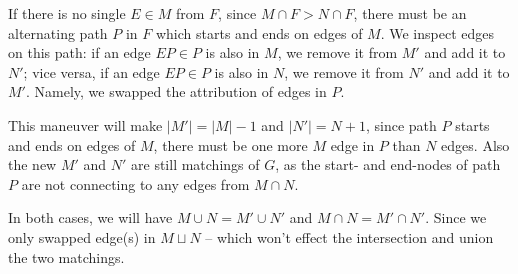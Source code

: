 \documentclass[11pt]{article}
\begin{document}
If there is no single $E \in M$ from $F$, since $M \cap F > N \cap F$, there must be an alternating path $P$ in $F$ which starts and ends on edges of $M$. We inspect edges on this path: if an edge $EP \in P$ is also in $M$, we remove it from $M'$ and add it to $N'$; vice versa, if an edge $EP \in P$ is also in $N$, we remove it from $N'$ and add it to $M'$. Namely, we swapped the attribution of edges in $P$.

This maneuver will make $|M'| = |M| - 1$ and $|N'| = N + 1$, since path $P$ starts and ends on edges of $M$, there must be one more $M$ edge in $P$ than $N$ edges. Also the new $M'$ and $N'$ are still matchings of $G$, as the start- and end-nodes of path $P$ are not connecting to any edges from $M \cap N$.\newline


In both cases, we will have $M \cup N = M' \cup N'$ and $M \cap N = M' \cap N'$. Since we only swapped edge(s) in $M \sqcup N$ -- which won't effect the intersection and union the two matchings.\newline





%
% 
% 
\end{document}
